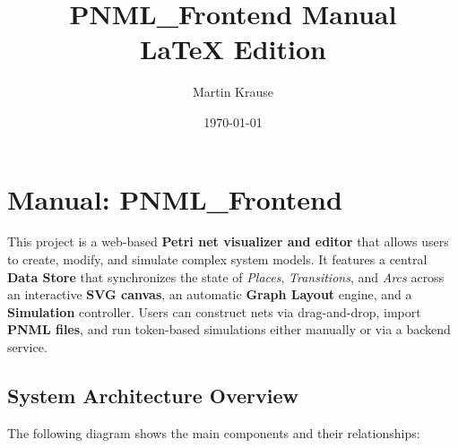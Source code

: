\documentclass[a4paper,11pt,oneside]{report}
\begin{document}
\title{PNML\_Frontend Manual\\{\large LaTeX Edition}}
\author{Martin Krause}
\date{\today}

\maketitle

\tableofcontents

\chapter{Manual: PNML\_Frontend}

This project is a web-based \textbf{Petri net visualizer and editor} that allows users to create, modify, and simulate complex system models. It features a central \textbf{Data Store} that synchronizes the state of \emph{Places}, \emph{Transitions}, and \emph{Arcs} across an interactive \textbf{SVG canvas}, an automatic \textbf{Graph Layout} engine, and a \textbf{Simulation} controller. Users can construct nets via drag-and-drop, import \textbf{PNML files}, and run token-based simulations either manually or via a backend service.

\section{System Architecture Overview}

The following diagram shows the main components and their relationships:
\end{document}
